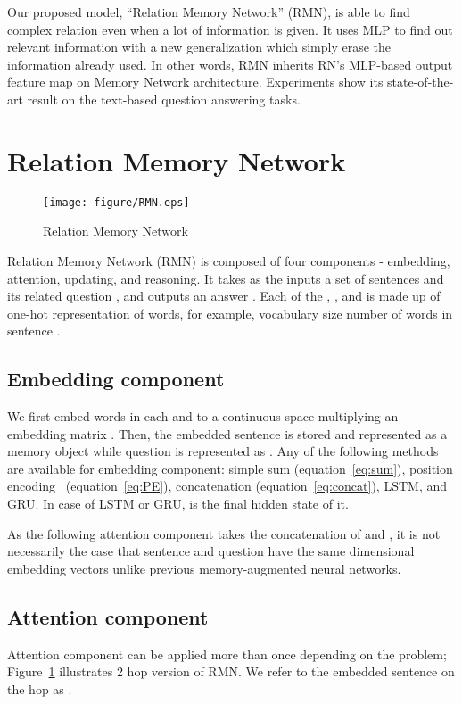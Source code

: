\documentclass{article} \usepackage{iclr2018_conference,times}
\begin{document}
Our proposed model, “Relation Memory Network” (RMN), is able to find complex relation even when a lot of information is given.
It uses MLP to find out relevant information with a new generalization which simply erase the information already used.
In other words, RMN inherits RN's MLP-based output feature map on Memory Network architecture.
Experiments show its state-of-the-art result on the text-based question answering tasks. 

\section{Relation Memory Network}



\begin{figure}[h!]
\centering
	\texttt{[image: figure/RMN.eps]}
	\caption{Relation Memory Network}
	\label{fig:RMN}
\end{figure}

Relation Memory Network (RMN) is composed of four components - embedding, attention, updating, and reasoning.
It takes as the inputs a set of sentences  and its related question , and outputs an answer .
Each of the , , and  is made up of one-hot representation of words, for example,   vocabulary size number of words in sentence .


\subsection{Embedding component} 
We first embed words in each  and  to a continuous space multiplying an embedding matrix .
Then, the embedded sentence is stored and represented as a memory object  while question is represented as .
Any of the following methods are available for embedding component: simple sum (equation~\ref{eq:sum}), position encoding~\citep{Weston15} (equation~\ref{eq:PE}), concatenation (equation~\ref{eq:concat}), LSTM, and GRU.
In case of LSTM or GRU,  is the final hidden state of it.



As the following attention component takes the concatenation of  and , it is not necessarily the case that sentence and question have the same dimensional embedding vectors unlike previous memory-augmented neural networks.


\subsection{Attention component} 
Attention component can be applied more than once depending on the problem; Figure~\ref{fig:RMN} illustrates 2 hop version of RMN.
We refer to the  embedded sentence on the  hop as .
\end{document}
